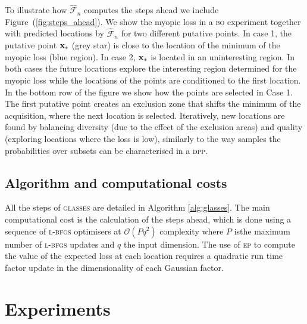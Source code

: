 \documentclass[twoside]{article}
\newcommand{\future}{\mathcal{F}}
\newcommand{\acr}[1]{\textsc{#1}\xspace}
\newcommand{\dpp}{\acr{dpp}}
\newcommand{\us}{\acr{glasses}}
\newcommand{\lbfgs}{\acr{l-bfgs}}
\newcommand{\ep}{\acr{ep}}
\newcommand{\bo}{\acr{bo}}
\begin{document}
To illustrate how $\hat{\future}_n$ computes the steps ahead we include Figure~(\ref{fig:steps_ahead}). We show the myopic loss in a \bo experiment together with predicted locations by $\hat{\future}_n$ for two different putative points. In case 1, the putative point $\mathbf{x}_*$ (grey star) is close to the location of the minimum of the myopic loss (blue region). In case 2, $\mathbf{x}_*$ is located in an uninteresting region. In both cases the future locations explore the interesting region determined for the myopic loss while the locations of the points are conditioned to the first location. In the bottom row of the figure we show how the points are selected in Case 1. The first putative point creates an exclusion zone that shifts the minimum of the acquisition, where the next location is selected. Iteratively, new locations are found by balancing diversity (due to the effect of the exclusion areas) and quality (exploring locations where the loss is low), similarly to the way samples the probabilities over subsets can be characterised in a \dpp \citep{MAL-044}.
 

\subsection{Algorithm and computational costs}
All the steps of \us are detailed in Algorithm \ref{alg:glasses}. The main computational cost is the calculation of the steps ahead, which is done using a sequence of \lbfgs optimisers at $\mathcal{O}(Pq^2)$ complexity where $P$  isthe maximum number of \lbfgs updates and $q$ the input dimension. The use of \ep to compute the value of the expected loss at each location requires a  quadratic run  time  factor  update in the dimensionality of each Gaussian factor.

\section{Experiments}\label{sec:experiments}


\end{document}
